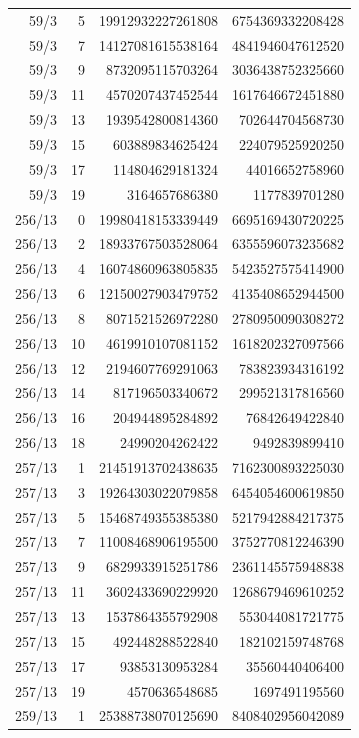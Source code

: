 \begin{longtable}{@{}rrrr@{}}
59/3 & 5 & 19912932227261808 & 6754369332208428\\
59/3 & 7 & 14127081615538164 & 4841946047612520\\
59/3 & 9 & 8732095115703264 & 3036438752325660\\
59/3 & 11 & 4570207437452544 & 1617646672451880\\
59/3 & 13 & 1939542800814360 & 702644704568730\\
59/3 & 15 & 603889834625424 & 224079525920250\\
59/3 & 17 & 114804629181324 & 44016652758960\\
59/3 & 19 & 3164657686380 & 1177839701280\\
256/13 & 0 & 19980418153339449 & 6695169430720225\\
256/13 & 2 & 18933767503528064 & 6355596073235682\\
256/13 & 4 & 16074860963805835 & 5423527575414900\\
256/13 & 6 & 12150027903479752 & 4135408652944500\\
256/13 & 8 & 8071521526972280 & 2780950090308272\\
256/13 & 10 & 4619910107081152 & 1618202327097566\\
256/13 & 12 & 2194607769291063 & 783823934316192\\
256/13 & 14 & 817196503340672 & 299521317816560\\
256/13 & 16 & 204944895284892 & 76842649422840\\
256/13 & 18 & 24990204262422 & 9492839899410\\
257/13 & 1 & 21451913702438635 & 7162300893225030\\
257/13 & 3 & 19264303022079858 & 6454054600619850\\
257/13 & 5 & 15468749355385380 & 5217942884217375\\
257/13 & 7 & 11008468906195500 & 3752770812246390\\
257/13 & 9 & 6829933915251786 & 2361145575948838\\
257/13 & 11 & 3602433690229920 & 1268679469610252\\
257/13 & 13 & 1537864355792908 & 553044081721775\\
257/13 & 15 & 492448288522840 & 182102159748768\\
257/13 & 17 & 93853130953284 & 35560440406400\\
257/13 & 19 & 4570636548685 & 1697491195560\\
259/13 & 1 & 25388738070125690 & 8408402956042089\\

\end{longtable}
